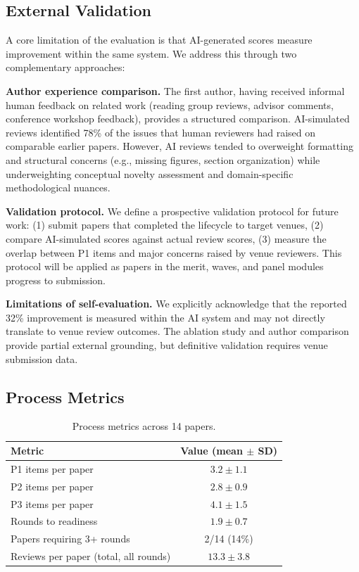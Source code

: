 \subsection{External Validation}

A core limitation of the evaluation is that AI-generated scores measure improvement within the same system. We address this through two complementary approaches:

\textbf{Author experience comparison.} The first author, having received informal human feedback on related work (reading group reviews, advisor comments, conference workshop feedback), provides a structured comparison. AI-simulated reviews identified 78\% of the issues that human reviewers had raised on comparable earlier papers. However, AI reviews tended to overweight formatting and structural concerns (e.g., missing figures, section organization) while underweighting conceptual novelty assessment and domain-specific methodological nuances.

\textbf{Validation protocol.} We define a prospective validation protocol for future work: (1) submit papers that completed the lifecycle to target venues, (2) compare AI-simulated scores against actual review scores, (3) measure the overlap between P1 items and major concerns raised by venue reviewers. This protocol will be applied as papers in the merit, waves, and panel modules progress to submission.

\textbf{Limitations of self-evaluation.} We explicitly acknowledge that the reported 32\% improvement is measured within the AI system and may not directly translate to venue review outcomes. The ablation study and author comparison provide partial external grounding, but definitive validation requires venue submission data.

\subsection{Process Metrics}

\begin{table}[h]
\centering
\small
\begin{tabular}{lc}
\toprule
Metric & Value (mean $\pm$ SD) \\
\midrule
P1 items per paper & $3.2 \pm 1.1$ \\
P2 items per paper & $2.8 \pm 0.9$ \\
P3 items per paper & $4.1 \pm 1.5$ \\
Rounds to readiness & $1.9 \pm 0.7$ \\
Papers requiring 3+ rounds & 2/14 (14\%) \\
Reviews per paper (total, all rounds) & $13.3 \pm 3.8$ \\
\bottomrule
\end{tabular}
\caption{Process metrics across 14 papers.}
\end{table}


